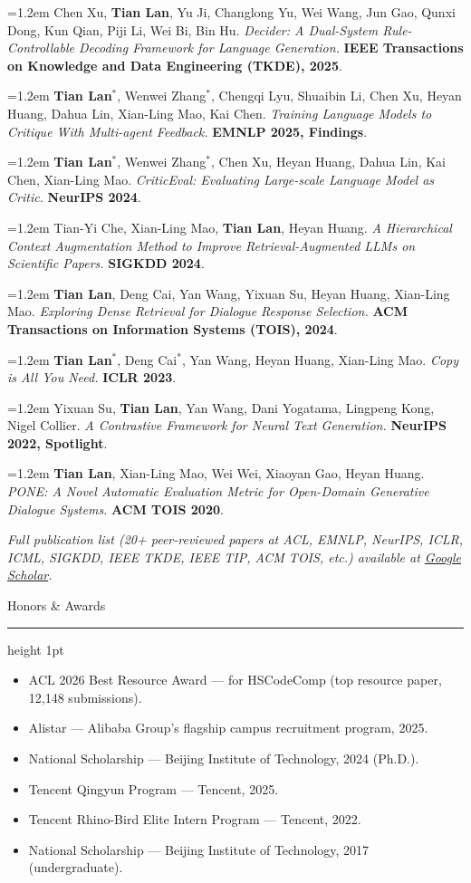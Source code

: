 \documentclass[10.5pt]{article}
\newcommand{\cvsection}[1]{%
  \vspace{10pt}
  {\color{accent}\headingfont\Large #1}\par
  \vspace{2pt}
  {\color{accent}\hrule height 1pt}
  \vspace{6pt}
}
\newcommand{\pubitem}[1]{\par\noindent\hangindent=1.2em\hangafter=1 #1\par\vspace{4pt}}
\newcommand{\venue}[1]{\textbf{\color{accent}#1}}
\begin{document}
\pubitem{Chen Xu, \textbf{Tian Lan}, Yu Ji, Changlong Yu, Wei Wang, Jun Gao, Qunxi Dong, Kun Qian, Piji Li, Wei Bi, Bin Hu. \textit{Decider: A Dual-System Rule-Controllable Decoding Framework for Language Generation.} \venue{IEEE Transactions on Knowledge and Data Engineering (TKDE), 2025}.}

\pubitem{\textbf{Tian Lan}$^{*}$, Wenwei Zhang$^{*}$, Chengqi Lyu, Shuaibin Li, Chen Xu, Heyan Huang, Dahua Lin, Xian-Ling Mao, Kai Chen. \textit{Training Language Models to Critique With Multi-agent Feedback.} \venue{EMNLP 2025, Findings}.}

\pubitem{\textbf{Tian Lan}$^{*}$, Wenwei Zhang$^{*}$, Chen Xu, Heyan Huang, Dahua Lin, Kai Chen, Xian-Ling Mao. \textit{CriticEval: Evaluating Large-scale Language Model as Critic.} \venue{NeurIPS 2024}.}

\pubitem{Tian-Yi Che, Xian-Ling Mao, \textbf{Tian Lan}, Heyan Huang. \textit{A Hierarchical Context Augmentation Method to Improve Retrieval-Augmented LLMs on Scientific Papers.} \venue{SIGKDD 2024}.}

\pubitem{\textbf{Tian Lan}, Deng Cai, Yan Wang, Yixuan Su, Heyan Huang, Xian-Ling Mao. \textit{Exploring Dense Retrieval for Dialogue Response Selection.} \venue{ACM Transactions on Information Systems (TOIS), 2024}.}

\pubitem{\textbf{Tian Lan}$^{*}$, Deng Cai$^{*}$, Yan Wang, Heyan Huang, Xian-Ling Mao. \textit{Copy is All You Need.} \venue{ICLR 2023}.}

\pubitem{Yixuan Su, \textbf{Tian Lan}, Yan Wang, Dani Yogatama, Lingpeng Kong, Nigel Collier. \textit{A Contrastive Framework for Neural Text Generation.} \venue{NeurIPS 2022, Spotlight}.}

\pubitem{\textbf{Tian Lan}, Xian-Ling Mao, Wei Wei, Xiaoyan Gao, Heyan Huang. \textit{PONE: A Novel Automatic Evaluation Metric for Open-Domain Generative Dialogue Systems.} \venue{ACM TOIS 2020}.}

{\small\itshape Full publication list (20+ peer-reviewed papers at ACL, EMNLP, NeurIPS, ICLR, ICML, SIGKDD, IEEE TKDE, IEEE TIP, ACM TOIS, etc.) available at \href{https://scholar.google.com/citations?user=B0W47gsAAAAJ&hl=zh-CN}{Google Scholar}.}

\cvsection{Honors \& Awards}
\begin{itemize}
  \item ACL 2026 Best Resource Award --- for HSCodeComp (top resource paper, 12{,}148 submissions).
  \item Alistar --- Alibaba Group's flagship campus recruitment program, 2025.
  \item National Scholarship --- Beijing Institute of Technology, 2024 (Ph.D.).
  \item Tencent Qingyun Program --- Tencent, 2025.
  \item Tencent Rhino-Bird Elite Intern Program --- Tencent, 2022.
  \item National Scholarship --- Beijing Institute of Technology, 2017 (undergraduate).
\end{itemize}
\end{document}
